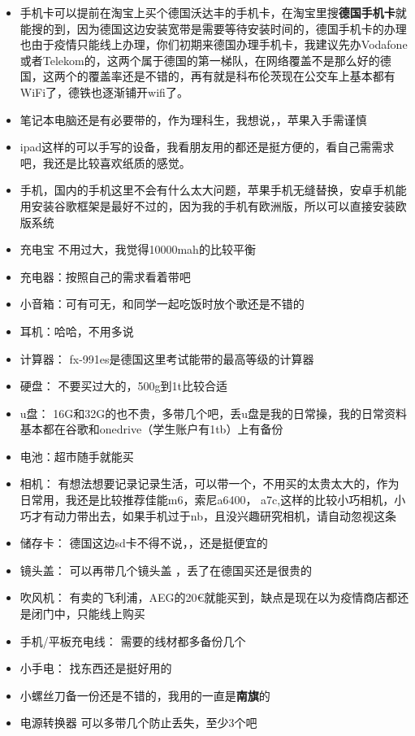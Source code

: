 \documentclass[doku]{subfiles}
\begin{document}
\begin{itemize}
	\item 手机卡可以提前在淘宝上买个德国沃达丰的手机卡，在淘宝里搜\textbf{德国手机卡}就能搜的到，因为德国这边安装宽带是需要等待安装时间的，德国手机卡的办理也由于疫情只能线上办理，你们初期来德国办理手机卡，我建议先办Vodafone或者Telekom的，这两个属于德国的第一梯队，在网络覆盖不是那么好的德国，这两个的覆盖率还是不错的，再有就是科布伦茨现在公交车上基本都有WiFi了，德铁也逐渐铺开wifi了。\label{simKarte}
	\item 笔记本电脑还是有必要带的，作为理科生，我想说，，苹果入手需谨慎
	\item ipad这样的可以手写的设备，我看朋友用的都还是挺方便的，看自己需需求吧，我还是比较喜欢纸质的感觉。
	\item 手机，国内的手机这里不会有什么太大问题，苹果手机无缝替换，安卓手机能用安装谷歌框架是最好不过的，因为我的手机有欧洲版，所以可以直接安装欧版系统
	\item 充电宝 不用过大，我觉得10000mah的比较平衡
	\item 充电器：按照自己的需求看着带吧
	\item 小音箱：可有可无，和同学一起吃饭时放个歌还是不错的
	\item 耳机：哈哈，不用多说
	\item 计算器： fx-991es是德国这里考试能带的最高等级的计算器
	\item 硬盘： 不要买过大的，500g到1t比较合适
	\item u盘： 16G和32G的也不贵，多带几个吧，丢u盘是我的日常操，我的日常资料基本都在谷歌和onedrive（学生账户有1tb）上有备份
	\item 电池：超市随手就能买
	\item 相机： 有想法想要记录记录生活，可以带一个，不用买的太贵太大的，作为日常用，我还是比较推荐佳能m6，索尼a6400， a7c,这样的比较小巧相机，小巧才有动力带出去，如果手机过于nb，且没兴趣研究相机，请自动忽视这条
	\item 储存卡： 德国这边sd卡不得不说，，还是挺便宜的
	\item 镜头盖： 可以再带几个镜头盖 ，丢了在德国买还是很贵的
	\item 吹风机： 有卖的飞利浦，AEG的20€就能买到，缺点是现在以为疫情商店都还是闭门中，只能线上购买
	\item 手机/平板充电线： 需要的线材都多备份几个
	\item 小手电： 找东西还是挺好用的
	\item 小螺丝刀备一份还是不错的，我用的一直是\textbf{南旗}的
	\item 电源转换器  可以多带几个防止丢失，至少3个吧

\end{itemize}
\end{document}
